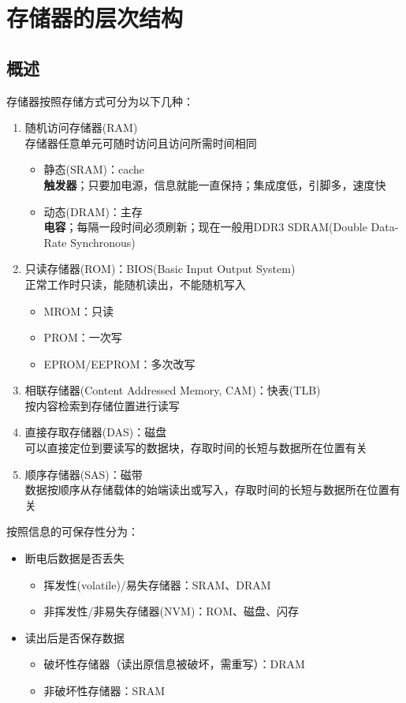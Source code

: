 
\section{存储器的层次结构}
\subsection{概述}
存储器按照存储方式可分为以下几种：
\begin{enumerate}
	\item 随机访问存储器(RAM)\\
	存储器任意单元可随时访问且访问所需时间相同
	\begin{itemize}
		\item 静态(SRAM)：cache\\
		\textbf{触发器}；只要加电源，信息就能一直保持；集成度低，引脚多，速度快
		\item 动态(DRAM)：主存\\
		\textbf{电容}；每隔一段时间必须刷新；现在一般用DDR3 SDRAM(Double Data-Rate Synchronous)
	\end{itemize}
	\item 只读存储器(ROM)：BIOS(Basic Input Output System)\\
	正常工作时只读，能随机读出，不能随机写入
	\begin{itemize}
		\item MROM：只读
		\item PROM：一次写
		\item EPROM/EEPROM：多次改写
	\end{itemize}
	\item 相联存储器(Content Addressed Memory, CAM)：快表(TLB)\\
	按内容检索到存储位置进行读写
	\item 直接存取存储器(DAS)：磁盘\\
	可以直接定位到要读写的数据块，存取时间的长短与数据所在位置有关
	\item 顺序存储器(SAS)：磁带\\
	数据按顺序从存储载体的始端读出或写入，存取时间的长短与数据所在位置有关
\end{enumerate}
按照信息的可保存性分为：
\begin{itemize}
	\item 断电后数据是否丢失
	\begin{itemize}
		\item 挥发性(volatile)/易失存储器：SRAM、DRAM
		\item 非挥发性/非易失存储器(NVM)：ROM、磁盘、闪存
	\end{itemize}
	\item 读出后是否保存数据
	\begin{itemize}
		\item 破坏性存储器（读出原信息被破坏，需重写）：DRAM
		\item 非破坏性存储器：SRAM
	\end{itemize}
\end{itemize}
